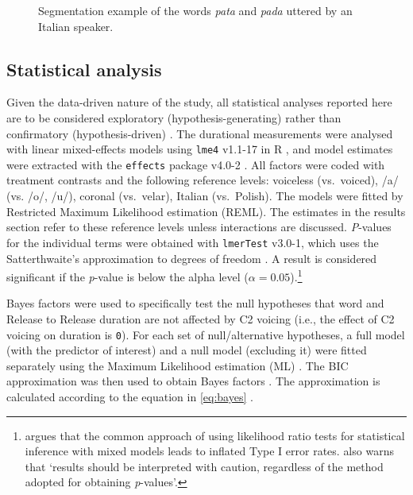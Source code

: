 \documentclass[preprint]{JASAnew}
\begin{document}
\begin{figure}
  \caption{Segmentation example of the words \textit{pata} and \textit{pada} uttered by an Italian speaker.}
  \label{f:segmentation}
\end{figure}

\subsection{Statistical analysis}\label{statistical-analysis}

Given the data-driven nature of the study, all statistical analyses
reported here are to be considered exploratory (hypothesis-generating)
rather than confirmatory (hypothesis-driven)
\citep{kerr1998, gelman2013, roettger2018}. The durational measurements
were analysed with linear mixed-effects models using \texttt{lme4}
v1.1-17 in R \citep{bates2015}, and model estimates were extracted with
the \texttt{effects} package v4.0-2 \citep{fox2003}. All factors were
coded with treatment contrasts and the following reference levels:
voiceless (vs.~voiced), /a/ (vs. /o/, /u/), coronal (vs.~velar), Italian
(vs.~Polish). The models were fitted by Restricted Maximum Likelihood
estimation (REML). The estimates in the results section refer to these
reference levels unless interactions are discussed. \emph{P}-values for
the individual terms were obtained with \texttt{lmerTest} v3.0-1, which
uses the Satterthwaite's approximation to degrees of freedom
\citep{kuznetsova2017, luke2017}. A result is considered significant if
the \emph{p}-value is below the alpha level
(\(\alpha = 0.05\)).\footnote{\citet{luke2017} argues that the common approach of using likelihood ratio tests for statistical inference with mixed models leads to inflated Type I error rates. \citet[1501]{luke2017} also warns that `results should be interpreted with caution, regardless of the method adopted for obtaining \textit{p}-values'.}

Bayes factors were used to specifically test the null hypotheses that
word and Release to Release duration are not affected by C2 voicing
(i.e., the effect of C2 voicing on duration is \texttt{0}). For each set
of null/alternative hypotheses, a full model (with the predictor of
interest) and a null model (excluding it) were fitted separately using
the Maximum Likelihood estimation (ML) \citep[p.~34]{bates2015}. The BIC
approximation was then used to obtain Bayes factors
\citep{raftery1995, raftery1999, wagenmakers2007, jarosz2014}. The
approximation is calculated according to the equation in \ref{eq:bayes}
\citep[p.~796]{wagenmakers2007}.
\end{document}
